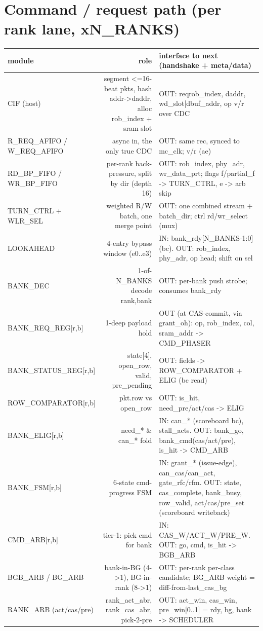 \documentclass[9pt]{extarticle}
\newenvironment{flow}{%
  \footnotesize\rowcolors{2}{white}{zeb}\begin{longtable}{M R I}
  \rowcolor{hb}\textbf{module} & \textbf{role} & \textbf{interface to next (handshake + meta/data)}\\ \midrule\endhead}
  {\bottomrule\end{longtable}}
\begin{document}
\section{Command / request path  \textcolor{headbg}{(per rank lane, xN\_RANKS)}}
\begin{flow}
CIF (host) & segment <=16-beat pkts, hash addr->daddr, alloc rob_index + sram slot & OUT: req{rob_index, daddr, wd_slot|dbuf_addr, op}  v/r over CDC\\
R_REQ_AFIFO / W_REQ_AFIFO & async in, the only true CDC & OUT: same rec, synced to mc_clk;  v/r (ae)\\
RD_BP_FIFO / WR_BP_FIFO & per-rank back-pressure, split by dir (depth 16) & OUT: {rob_index, phy_adr, wr_data_prt};  flags f/partial_f -> TURN_CTRL,  e -> arb skip\\
TURN_CTRL + WLR_SEL & weighted R/W batch, one merge point & OUT: one combined stream + batch_dir;  ctrl rd/wr_select (mux)\\
LOOKAHEAD & 4-entry bypass window (e0..e3) & IN: bank_rdy[N_BANKS-1:0] (bc). OUT: {rob_index, phy_adr, op} head;  shift on sel\\
BANK_DEC & 1-of-N_BANKS decode {rank,bank} & OUT: per-bank push strobe;  consumes bank_rdy\\
BANK_REQ_REG[r,b] & 1-deep payload hold & OUT (at CAS-commit, via grant_oh): {op, rob_index, col, sram_addr} -> CMD_PHASER\\
BANK_STATUS_REG[r,b] & state[4], open_row, valid, pre_pending & OUT: fields -> ROW_COMPARATOR + ELIG (bc read)\\
ROW_COMPARATOR[r,b] & pkt.row vs open_row & OUT: is_hit, need_pre/act/cas -> ELIG\\
BANK_ELIG[r,b] & need_* \& can_* fold & IN: can_* (scoreboard bc), stall_acts. OUT: bank_go, bank_cmd(cas/act/pre), is_hit -> CMD_ARB\\
BANK_FSM[r,b] & 6-state cmd-progress FSM & IN: grant_* (issue-edge), can_cas/can_act, gate_rfc/rfm. OUT: state, cas_complete, bank_busy, row_valid, act/cas/pre_set (scoreboard writeback)\\
CMD_ARB[r,b] & tier-1: pick cmd for bank & IN: CAS_W/ACT_W/PRE_W. OUT: {go, cmd, is_hit} -> BGB_ARB\\
BGB_ARB / BG_ARB & bank-in-BG (4->1), BG-in-rank (8->1) & OUT: per-rank per-class candidate;  BG_ARB weight = diff-from-last_cas_bg\\
RANK_ARB (act/cas/pre) & rank_act_abr, rank_cas_abr, pick-2-pre & OUT: act_win, cas_win, pre_win[0..1] = {rdy, bg, bank} -> SCHEDULER\\

\end{flow}
\end{document}
